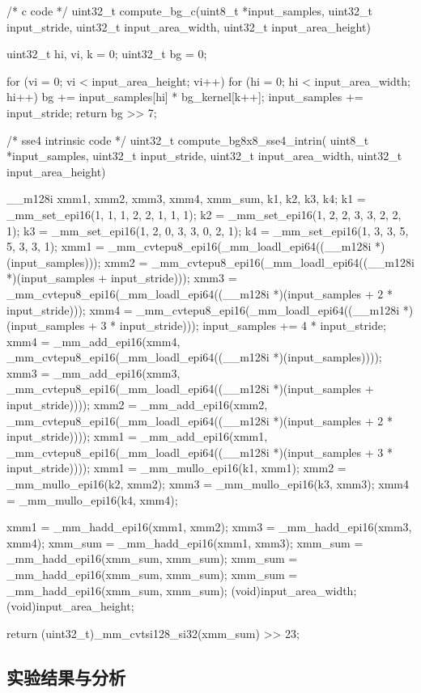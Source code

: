   \begin{codeblock}[language=C]
/* c code */
uint32_t compute_bg_c(uint8_t *input_samples,
                        uint32_t input_stride,
                        uint32_t input_area_width,
                        uint32_t input_area_height)
{
    uint32_t hi, vi, k = 0;
    uint32_t bg = 0;

    for (vi = 0; vi < input_area_height; vi++) {
        for (hi = 0; hi < input_area_width; hi++) {
            bg += input_samples[hi] * bg_kernel[k++];
        }
        input_samples += input_stride;
    }
    return bg >> 7;
}
/* sse4 intrinsic code */
uint32_t compute_bg8x8_sse4_intrin(
uint8_t *input_samples,
uint32_t input_stride,
uint32_t input_area_width,
uint32_t input_area_height)
{
    __m128i xmm1, xmm2, xmm3, xmm4, xmm_sum, k1, k2, k3, k4;
    k1 = _mm_set_epi16(1, 1, 1, 2, 2, 1, 1, 1);
    k2 = _mm_set_epi16(1, 2, 2, 3, 3, 2, 2, 1);
    k3 = _mm_set_epi16(1, 2, 0, 3, 3, 0, 2, 1);
    k4 = _mm_set_epi16(1, 3, 3, 5, 5, 3, 3, 1);
    xmm1     = _mm_cvtepu8_epi16(_mm_loadl_epi64((__m128i *)(input_samples)));
    xmm2     = _mm_cvtepu8_epi16(_mm_loadl_epi64((__m128i *)(input_samples + input_stride)));
    xmm3     = _mm_cvtepu8_epi16(_mm_loadl_epi64((__m128i *)(input_samples + 2 * input_stride)));
    xmm4     = _mm_cvtepu8_epi16(_mm_loadl_epi64((__m128i *)(input_samples + 3 * input_stride)));
    input_samples += 4 * input_stride;
    xmm4     = _mm_add_epi16(xmm4, _mm_cvtepu8_epi16(_mm_loadl_epi64((__m128i *)(input_samples))));
    xmm3     = _mm_add_epi16(xmm3, _mm_cvtepu8_epi16(_mm_loadl_epi64((__m128i *)(input_samples + input_stride))));
    xmm2     = _mm_add_epi16(xmm2, _mm_cvtepu8_epi16(_mm_loadl_epi64((__m128i *)(input_samples + 2 * input_stride))));
    xmm1     = _mm_add_epi16(xmm1, _mm_cvtepu8_epi16(_mm_loadl_epi64((__m128i *)(input_samples + 3 * input_stride))));
    xmm1     = _mm_mullo_epi16(k1, xmm1);
    xmm2     = _mm_mullo_epi16(k2, xmm2);
    xmm3     = _mm_mullo_epi16(k3, xmm3);
    xmm4     = _mm_mullo_epi16(k4, xmm4);

    xmm1     = _mm_hadd_epi16(xmm1, xmm2);
    xmm3     = _mm_hadd_epi16(xmm3, xmm4);
    xmm_sum = _mm_hadd_epi16(xmm1, xmm3);
    xmm_sum = _mm_hadd_epi16(xmm_sum, xmm_sum);
    xmm_sum = _mm_hadd_epi16(xmm_sum, xmm_sum);
    xmm_sum = _mm_hadd_epi16(xmm_sum, xmm_sum);
    (void)input_area_width;
    (void)input_area_height;

    return (uint32_t)_mm_cvtsi128_si32(xmm_sum) >> 23;
}
  \end{codeblock}
  \subsection{实验结果与分析}

